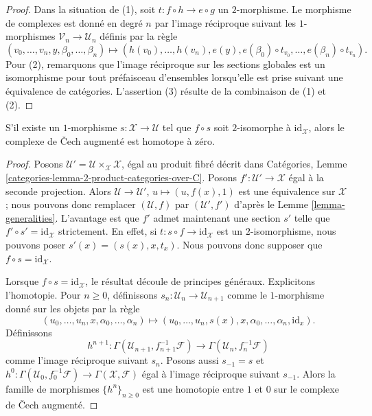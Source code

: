 \begin{proof}
Dans la situation de (1), soit $t : f \circ h \to e \circ g$ un $2$-morphisme.
Le morphisme de complexes est donné en degré $n$ par
l'image réciproque suivant les $1$-morphismes
$\mathcal{V}_n \to \mathcal{U}_n$ définis par la règle
$$
(v_0, \ldots, v_n, y, \beta_0, \ldots, \beta_n)
\longmapsto
(h(v_0), \ldots, h(v_n), e(y),
e(\beta_0) \circ t_{v_0}, \ldots, e(\beta_n) \circ t_{v_n}).
$$
Pour (2), remarquons que l'image réciproque sur les sections globales est un isomorphisme
pour tout préfaisceau d'ensembles lorsqu'elle est prise suivant une équivalence
de catégories. L'assertion (3) résulte de la combinaison de (1) et (2).
\end{proof}

\begin{lemma}
\label{lemma-homotopy}
S'il existe un $1$-morphisme $s : \mathcal{X} \to \mathcal{U}$
tel que $f \circ s$ soit $2$-isomorphe à $\text{id}_\mathcal{X}$,
alors le complexe de {\v C}ech augmenté est homotope à zéro.
\end{lemma}

\begin{proof}
Posons $\mathcal{U}' = \mathcal{U} \times_\mathcal{X} \mathcal{X}$,
égal au produit fibré décrit dans
Catégories, Lemme \ref{categories-lemma-2-product-categories-over-C}.
Posons $f' : \mathcal{U}' \to \mathcal{X}$ égal à la seconde projection.
Alors $\mathcal{U} \to \mathcal{U}'$, $u \mapsto (u, f(x), 1)$
est une équivalence sur $\mathcal{X}$ ; nous pouvons donc remplacer
$(\mathcal{U}, f)$ par $(\mathcal{U}', f')$ d'après le
Lemme \ref{lemma-generalities}.
L'avantage est que $f'$ admet maintenant une section $s'$ telle
que $f' \circ s' = \text{id}_\mathcal{X}$ strictement. En effet, si
$t : s \circ f \to \text{id}_\mathcal{X}$ est un $2$-isomorphisme,
nous pouvons poser $s'(x) = (s(x), x, t_x)$. Nous pouvons donc supposer que
$f \circ s = \text{id}_\mathcal{X}$.

\medskip\noindent
Lorsque $f \circ s = \text{id}_\mathcal{X}$, le résultat découle
de principes généraux. Explicitons l'homotopie. Pour
$n \geq 0$, définissons $s_n : \mathcal{U}_n \to \mathcal{U}_{n + 1}$
comme le $1$-morphisme donné sur les objets par la règle
$$
(u_0, \ldots, u_n, x, \alpha_0, \ldots, \alpha_n)
\longmapsto
(u_0, \ldots, u_n, s(x), x,
\alpha_0, \ldots, \alpha_n, \text{id}_x).
$$
Définissons
$$
h^{n + 1} :
\Gamma(\mathcal{U}_{n + 1}, f_{n + 1}^{-1}\mathcal{F})
\longrightarrow
\Gamma(\mathcal{U}_n, f_n^{-1}\mathcal{F})
$$
comme l'image réciproque suivant $s_n$. Posons aussi $s_{-1} = s$ et
$h^0 : \Gamma(\mathcal{U}_0, f_0^{-1}\mathcal{F}) \to
\Gamma(\mathcal{X}, \mathcal{F})$ égal à l'image réciproque suivant $s_{-1}$.
Alors la famille de morphismes $\{h^n\}_{n \geq 0}$ est une homotopie entre
$1$ et $0$ sur le complexe de {\v C}ech augmenté.
\end{proof}










